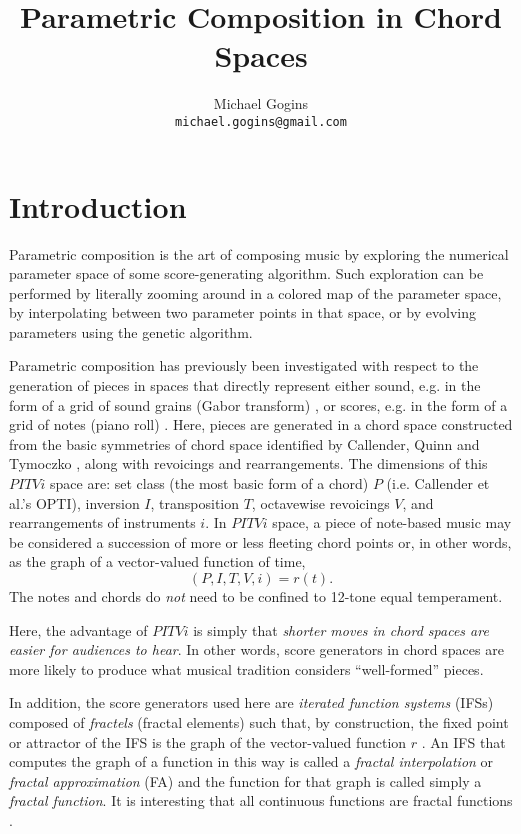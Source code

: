 \documentclass[english,11pt,letterpaper,onecolumn]{scrartcl}
\begin{document}
\title{Parametric Composition in Chord Spaces}
\author{Michael Gogins \\ \texttt{michael.gogins@gmail.com}}
\maketitle


\section{Introduction}

Parametric composition is the art of composing music by exploring the 
numerical parameter space of some score-generating algorithm. Such exploration 
can be performed by literally zooming around in a colored map of the parameter 
space, by interpolating between two parameter points in that space, or by 
evolving parameters using the genetic algorithm. 

Parametric composition has previously been investigated with respect to 
the generation of pieces in spaces that directly represent either sound, 
e.g. in the form of a grid of sound grains (Gabor transform) \cite{obsessed}, 
or scores, e.g. in the form of a grid of notes (piano roll) \cite{ifsmusic}. 
Here, pieces are generated in a chord space constructed from the basic 
symmetries of chord space identified by Callender, 
Quinn and Tymoczko \cite{callender346}, along with revoicings and 
rearrangements. The dimensions of this $PITVi$ space are: set class 
(the most basic form of a chord) $P$ (i.e. Callender et al.'s OPTI), 
inversion $I$, transposition $T$, octavewise revoicings $V$, and rearrangements 
of instruments $i$. In $PITVi$ space, a piece of note-based music may be 
considered a succession of more or less fleeting chord points or, in other 
words, as the graph of a vector-valued function of time, $$(P, I, T, V, i) = 
r(t).$$ The notes and chords do \textit{not} need to be confined to 12-tone 
equal temperament.

Here, the advantage of $PITVi$ is simply that \textit{shorter moves 
in chord spaces are easier for audiences to hear}. In other words, score 
generators in chord spaces are more likely to produce what musical tradition 
considers ``well-formed'' pieces.

In addition, the score generators used here are \textit{iterated function 
systems} (IFSs) \cite{barnsley1985iterated, 
10.2307/24893080, fractalseverywhere} composed of \textit{fractels} (fractal 
elements) such that, by construction, the fixed point or attractor of the IFS 
is the graph of the vector-valued function $r$ \cite{2016arXiv161001369B}. An 
IFS that computes the graph of a function in this way is called a 
\textit{fractal interpolation} or \textit{fractal approximation} (FA) 
\cite{barnsley1986, fractalseverywhere, navascues2014fractal} and the function 
for that graph is called simply a \textit{fractal function}. It is interesting 
that all continuous functions are fractal functions \cite{2016arXiv161001369B}.
\end{document}
